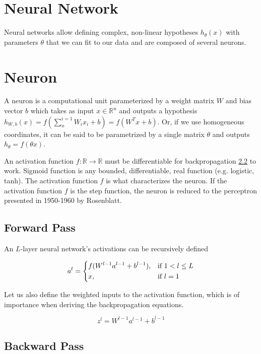 \section{Neural Network}

Neural networks allow defining complex, non-linear hypotheses $h_\theta(x)$ with parameters $\theta$ that we can fit to our data and are composed of several neurons.

\section{Neuron}

A neuron is a computational unit parameterized by a weight matrix $W$ and bias vector $b$ which takes as input $x \in \mathbb{R}^{n}$ and outputs a hypothesis $h_{W,b}(x) = f(\sum^{i=1}_{n} W_{i}x_{i} + b) = f(W^Tx + b)$. Or, if we use homogeneous coordinates, it can be said to be parametrized by a single matrix $\theta$ and outputs $h_{\theta} = f(\theta x)$.

An activation function $f \colon \mathbb{R} \to \mathbb{R}$ must be differentiable for backpropagation \ref{subsection:backwardpass} to work. Sigmoid function is any bounded, differentiable, real function (e.g. logistic, tanh).
The activation function $f$ is what characterizes the neuron. If the activation function $f$ is the step function, the neuron is reduced to the perceptron presented in 1950-1960 by Rosenblatt\cite{perceptron}.

\subsection{Forward Pass}
\label{subsection:forwardpass}

An $L$-layer neural network's activations can be recursively defined

$$
a^{l} =
\begin{dcases}
    f(W^{l-1}a^{l-1} + b^{l-1}),& \text{if } 1 < l \leq L\\
    x,              & \text{if } l = 1
\end{dcases}
$$

Let us also define the weighted inputs to the activation function, which is of importance when deriving the backpropagation equations.

$$
z^{l} = W^{l-1}a^{l-1} + b^{l-1}
$$

\subsection{Backward Pass}
\label{subsection:backwardpass}

